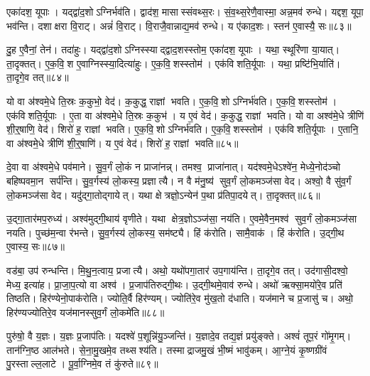 एका॑दश॒ यूपाः। यद्द्वा॑द॒शोऽग्निर्भव॑ति। द्वाद॑श॒ मासास्संवथ्स॒रः। सं॒व॒थ्स॒रेणै॒वास्मा॒ अन्न॒मव॑ रुन्धे। यद्दश॒ यूपा॒ भव॑न्ति। दशाक्षरा वि॒राट्। अन्नं॑ वि॒राट्। वि॒राजै॒वान्नाद्य॒मव॑ रुन्धे। य ए॑काद॒शः। स्तन॑ ए॒वास्यै॒ सः॥८३॥

दु॒ह ए॒वैनां॒ तेन॑। तदा॑हुः। यद्द्वा॑द॒शोऽग्निस्स्याद्द्वाद॒शस्स्तोम॒ एका॑दश॒ यूपाः। यथा॒ स्थूरि॑णा या॒यात्। ता॒दृक्तत्। ए॒क॒वि॒श ए॒वाग्निस्स्या॒दित्या॑हुः। ए॒क॒वि॒शस्स्तोम॑। एक॑विशति॒र्यूपाः। यथा॒ प्रष्टि॑भि॒र्याति॑। ता॒दृगे॒व तत्॥८४॥

यो वा अ॑श्वमे॒धे ति॒स्रः क॒कुभो॒ वेद॑। क॒कुद्ध॒ राज्ञां भवति। ए॒क॒वि॒शोऽग्निर्भ॑वति। ए॒क॒वि॒शस्स्तोम॑। एक॑विशति॒र्यूपाः। ए॒ता वा अ॑श्वमे॒धे ति॒स्रः क॒कुभ॑। य ए॒वं वेद॑। क॒कुद्ध॒ राज्ञां भवति। यो वा अश्व॑मे॒धे त्रीणि॑ शी॒र्॒षाणि॒ वेद॑। शिरो॑ ह॒ राज्ञां भवति। ए॒क॒वि॒शोऽग्निर्भ॑वति। ए॒क॒वि॒शस्स्तोम॑। एक॑विशति॒र्यूपाः। ए॒तानि॒ वा अ॑श्वमे॒धे त्रीणि॑ शी॒र्॒षाणि॑। य ए॒वं वेद॑। शिरो॑ ह॒ राज्ञां भवति॥८५॥\anuvakamend[द्वा॒द॒शस्स्तोम॒ स ए॒व तच्छिरो॑ ह॒ राज्ञां भवति॒ षट् च॑]

दे॒वा वा अ॑श्वमे॒धे पव॑माने। सु॒व॒र्गं लो॒कं न प्राजा॑नन्न्। तमश्व॒ प्राजा॑नात्। यद॑श्वमे॒धेऽश्वे॑न॒ मेध्ये॒नोद॑ञ्चो बहिष्पवमा॒न सर्प॑न्ति। सु॒व॒र्गस्य॑ लो॒कस्य॒ प्रज्ञात्यै। न वै म॑नु॒ष्य॑ सुव॒र्गं लो॒कमञ्ज॑सा वेद। अश्वो॒ वै सु॑व॒र्गं लो॒कमञ्ज॑सा वेद। यदु॑द्गा॒तोद्गायेत्। यथा क्षेत्रज्ञो॒ऽन्येन॑ प॒था प्र॑तिपा॒दयेत्। ता॒दृक्तत्॥८६॥

उ॒द्गा॒तार॑मप॒रुध्य॑। अश्व॑मुद्गी॒थाय॑ वृणीते। यथा क्षेत्र॒ज्ञोऽञ्ज॑सा॒ नय॑ति। ए॒वमे॒वैन॒मश्व॑ सुव॒र्गं लो॒कमञ्ज॑सा नयति। पुच्छ॑म॒न्वा र॑भन्ते। सु॒व॒र्गस्य॑ लो॒कस्य॒ सम॑ष्ट्यै। हिं क॑रोति। सामै॒वाक॑। हिं क॑रोति। उ॒द्गी॒थ ए॒वास्य॒ सः॥८७॥

वड॑बा॒ उप॑ रुन्धन्ति। मि॒थु॒न॒त्वाय॒ प्रजात्यै। अथो॒ यथो॑पगा॒तार॑ उप॒गाय॑न्ति। ता॒दृगे॒व तत्। उद॑गासी॒दश्वो॒ मेध्य॒ इत्या॑ह। प्रा॒जा॒प॒त्यो वा अश्व॑। प्र॒जाप॑तिरुद्गी॒थः। उ॒द्गी॒थमे॒वाव॑ रुन्धे। अथो॑ ऋक्सा॒मयो॑रे॒व प्रति॑ तिष्ठति। हिर॑ण्येनो॒पाक॑रोति। ज्योति॒र्वै हिर॑ण्यम्। ज्योति॑रे॒व मु॑ख॒तो द॑धाति। यज॑माने च प्र॒जासु॑ च। अथो॒ हिर॑ण्यज्योतिरे॒व यज॑मानस्सुव॒र्गं लो॒कमे॑ति॥८८॥\anuvakamend[तथ्स उ॒पाक॑रोति च॒त्वारि॑ च]

पुरु॑षो॒ वै य॒ज्ञः। य॒ज्ञः प्र॒जाप॑तिः। यदश्वे॑ प॒शून्नि॑यु॒ञ्जन्ति॑। य॒ज्ञादे॒व तद्य॒ज्ञं प्रयु॑ङ्क्ते। अश्वं॑ तूप॒रं गो॑मृ॒गम्। तान॑ग्नि॒ष्ठ आल॑भते। से॒ना॒मु॒खमे॒व तथ्सश्य॑ति। तस्माद्राजमु॒खं भी॒ष्मं भावु॑कम्। आ॒ग्ने॒यं कृ॒ष्णग्री॑वं पु॒रस्ताल्ल॒लाटे। पू॒र्वा॒ग्निमे॒व तं कु॑रुते॥८९॥

